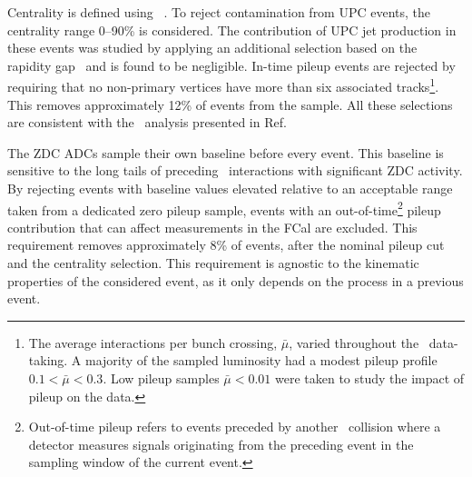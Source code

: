\documentclass[PAPER, atlasdraft=false, USenglish, cernpreprint]{atlasdoc}
\begin{document}
Centrality is defined using 
\ETPB~\cite{ATLAS:2015hkr,ATLAS:2019vcm,ATLAS:2023zfx}. 
To reject contamination from UPC events, the centrality range 0--90\% is considered.
The contribution of UPC jet production in these events was studied by applying an additional selection based on the rapidity gap~\cite{HION-2018-27} and is found to be negligible.
In-time pileup events are rejected by requiring that no non-primary vertices have more than six associated tracks\footnote{The average interactions per bunch crossing, $\bar\mu$, varied throughout the \pxPb\ data-taking. A majority of the sampled luminosity had a modest pileup profile $ 0.1 < \bar \mu < 0.3$. Low pileup samples $\bar \mu < 0.01$ were taken to study the impact of pileup on the data.}.
This removes approximately 12\% of events from the sample.
All these selections are consistent with the \pxPb\ analysis presented in Ref.~\cite{ATLAS:2023zfx}











The ZDC ADCs sample their own baseline before every event. 
This baseline is sensitive to the long tails of preceding \pxPb\ interactions with significant ZDC activity.
 By rejecting events with baseline values elevated relative to an acceptable range taken from a dedicated zero pileup sample, events with an out-of-time\footnote{Out-of-time pileup refers to events preceded by another \pxPb\ collision where a detector measures signals originating from the preceding event in the sampling window of the current event.} pileup contribution that can affect measurements in the FCal are excluded. 
This requirement removes approximately 8\% of events, after the nominal pileup cut and the centrality selection.
This requirement is agnostic to the kinematic properties of the considered event, as it only depends on the process in a previous event.
\end{document}
